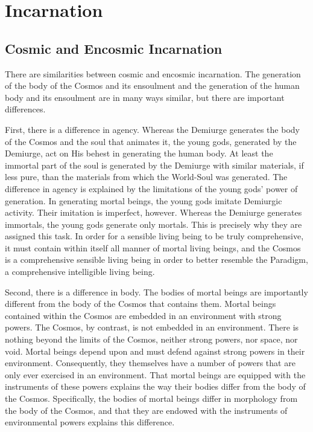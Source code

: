 \chapter{Incarnation} %
\label{cha:incarnation}

\section{Cosmic and Encosmic Incarnation} %
\label{sec:cosmic_and_encosmic_incarnation}

There are similarities between cosmic and encosmic incarnation. The generation of the body of the Cosmos and its ensoulment and the generation of the human body and its ensoulment are in many ways similar, but there are important differences. 

First, there is a difference in agency. Whereas the Demiurge generates the body of the Cosmos and the soul that animates it, the young gods, generated by the Demiurge, act on His behest in generating the human body. At least the immortal part of the soul is generated by the Demiurge with similar materials, if less pure, than the materials from which the World-Soul was generated. The difference in agency is explained by the limitations of the young gods' power of generation. In generating mortal beings, the young gods imitate Demiurgic activity. Their imitation is imperfect, however. Whereas the Demiurge generates immortals, the young gods generate only mortals. This is precisely why they are assigned this task. In order for a sensible living being to be truly comprehensive, it must contain within itself all manner of mortal living beings, and the Cosmos is a comprehensive sensible living being in order to better resemble the Paradigm, a comprehensive intelligible living being. 

Second, there is a difference in body. The bodies of mortal beings are importantly different from the body of the Cosmos that contains them. Mortal beings contained within the Cosmos are embedded in an environment with strong powers. The Cosmos, by contrast, is not embedded in an environment. There is nothing beyond the limits of the Cosmos, neither strong powers, nor space, nor void. Mortal beings depend upon and must defend against strong powers in their environment. Consequently, they themselves have a number of powers that are only ever exercised in an environment. That mortal beings are equipped with the instruments of these powers explains the way their bodies differ from the body of the Cosmos. Specifically, the bodies of mortal beings differ in morphology from the body of the Cosmos, and that they are endowed with the instruments of environmental powers explains this difference.

